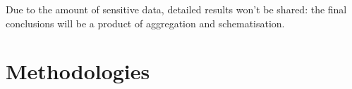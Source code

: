 Due to the amount of sensitive data, detailed results won't be shared: the final conclusions will be a product of aggregation and schematisation.

\section{Methodologies}
